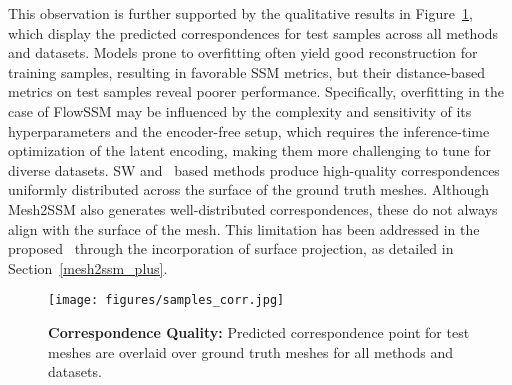 This observation is further supported by the qualitative results in Figure~\ref{fig:corr_quality}, which display the predicted correspondences for test samples across all methods and datasets. Models prone to overfitting often yield good reconstruction for training samples, resulting in favorable SSM metrics, but their distance-based metrics on test samples reveal poorer performance. Specifically, overfitting in the case of FlowSSM may be influenced by the complexity and sensitivity of its hyperparameters and the encoder-free setup, which requires the inference-time optimization of the latent encoding, making them more challenging to tune for diverse datasets. SW and \model~based methods produce high-quality correspondences uniformly distributed across the surface of the ground truth meshes. Although Mesh2SSM also generates well-distributed correspondences, these do not always align with the surface of the mesh. This limitation has been addressed in the proposed \model~through the incorporation of surface projection, as detailed in Section~\ref{mesh2ssm_plus}.

\begin{figure}
    \centering
    \texttt{[image: figures/samples\_corr.jpg]}
    \caption{\textbf{Correspondence Quality: }Predicted correspondence
point for test meshes are overlaid over ground truth meshes for all methods and datasets.}
    \label{fig:corr_quality}
\end{figure}



